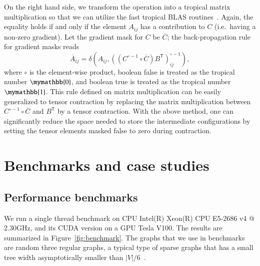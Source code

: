 \documentclass[onefignum, onetabnum]{siamart190516}
\newcommand{\<}{\langle}
\renewcommand{\>}{\rangle}
\begin{document}
On the right hand side, we transform the operation into a tropical matrix multiplication so that we can utilize the fast tropical BLAS routines~\cite{TropicalGEMM}.
Again, the equality holds if and only if the element $A_{ij}$ has a contribution to $C$ (i.e.\ having a non-zero gradient).
Let the gradient mask for $C$ be $\overline C$; the back-propagation rule for gradient masks reads
\begin{equation}
\overline{A}_{ij} = \delta \left(A_{ij}, \left( \left( C^{\circ-1} \circ \overline C \right) B^{\mathsf{T}} \right)_{ij}^{\circ -1} \right),
\end{equation}
where $\circ$ is the element-wise product, boolean false is treated as the tropical number $\mymathbb{0}$, and boolean true is treated as the tropical number $\mymathbb{1}$.
This rule defined on matrix multiplication can be easily generalized to tensor contraction by replacing the matrix multiplication between $C^{\circ-1} \circ \overline C$ and $B^{\mathsf{T}}$ by a tensor contraction.
With the above method, one can significantly reduce the space needed to store the intermediate configurations by setting the tensor elements masked false to zero during contraction.

\section{Benchmarks and case studies}
\subsection{Performance benchmarks}
We run a single thread benchmark on CPU Intel(R) Xeon(R) CPU E5-2686 v4 @ 2.30GHz,
and its CUDA version on a GPU Tesla V100.
The results are summarized in Figure~\ref{fig:benchmark}.
The graphs that we use in benchmarks are random three regular graphs,
 a typical type of sparse graphs that has a small tree width asymptotically smaller than $|V|/6$~\cite{Fomin2006}.
\end{document}

